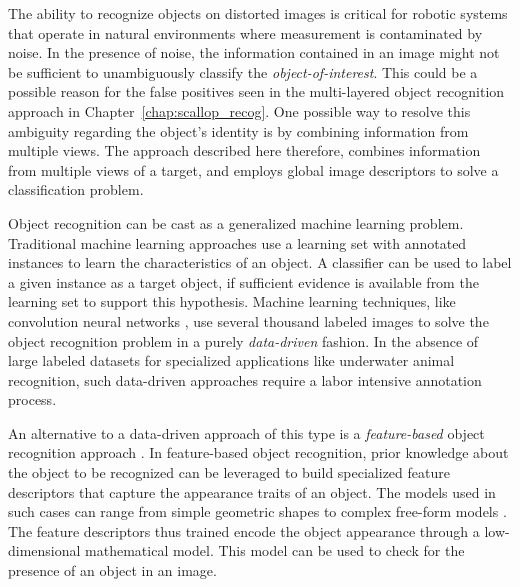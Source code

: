 \documentclass {udthesis}
\begin{document}
The ability to recognize objects on distorted images is critical for robotic systems that operate in natural environments where measurement is contaminated by noise. In the presence of noise, the information contained in an image might not be sufficient to unambiguously classify the \emph{object-of-interest}. This could be a possible reason for the false positives seen in the multi-layered object recognition approach in Chapter~\ref{chap:scallop_recog}.
One possible way to resolve this ambiguity regarding the object's identity is by combining information from multiple views. The approach described here therefore, combines information from multiple views of a target, and employs global image descriptors to solve a classification problem.

Object recognition can be cast as a generalized machine learning problem.
Traditional machine learning approaches \cite{alpaydin} use a learning set with annotated instances to learn the characteristics of an object. A classifier can be used to label a given instance as a target object, if sufficient evidence is available from the learning set to support this hypothesis. Machine learning techniques, like convolution neural networks \cite{cnn}, use several thousand labeled images to solve the object recognition problem in a purely \emph{data-driven} fashion. In the absence of large labeled datasets for specialized applications like underwater animal recognition, such data-driven approaches require a labor intensive annotation process.

An alternative to a data-driven approach of this type is a \emph{feature-based} object recognition approach \cite{roth}. In feature-based object recognition, prior knowledge about the object to be recognized can be leveraged to build specialized feature descriptors that capture the appearance traits of an object. The models used in such cases can range from simple geometric shapes to complex free-form models \cite{campbell, belongie}. The feature descriptors thus trained encode the object appearance through a low-dimensional mathematical model. This model can be used to check for the presence of an object in an image.
\end{document}
